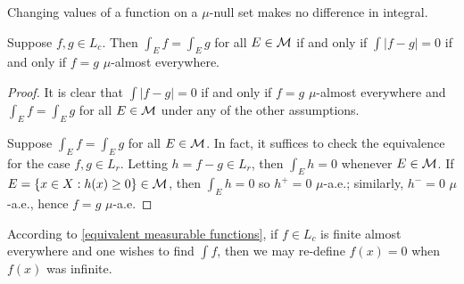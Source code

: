 Changing values of a function on a $\mu$-null set makes no difference in integral.
\begin{lem}\label{equivalent measurable functions}
    Suppose $f, g\in L_c$.
    Then $\int_E f=\int_E g$ for all $E\in{\mathcal{M}}$ if and only if $\int|f-g|=0$ if and only if $f=g$ $\mu$-almost everywhere.
\end{lem}
\begin{proof}
    It is clear that $\int|f-g|=0$ if and only if $f=g$ $\mu$-almost everywhere and $\int_E f=\int_E g$ for all $E\in{\mathcal{M}}$ under any of the other assumptions.

    Suppose $\int_E f=\int_E g$ for all $E\in{\mathcal{M}}$.
    In fact, it suffices to check the equivalence for the case $f, g\in L_r$.
    Letting $h=f-g\in L_r$, then $\int_E h=0$ whenever $E\in{\mathcal{M}}$.
    If $E=\{x\in X: h(x)\geq 0\}\in{\mathcal{M}}$, then $\int_E h=0$ so $h^+=0$ $\mu$-a.e.; similarly, $h^-=0$ $\mu$-a.e., hence $f=g$ $\mu$-a.e.
\end{proof}
According to \cref{equivalent measurable functions}, if $f\in L_c$ is finite almost everywhere and one wishes to find $\int f$, then we may re-define $f(x)=0$ when $f(x)$ was infinite.

